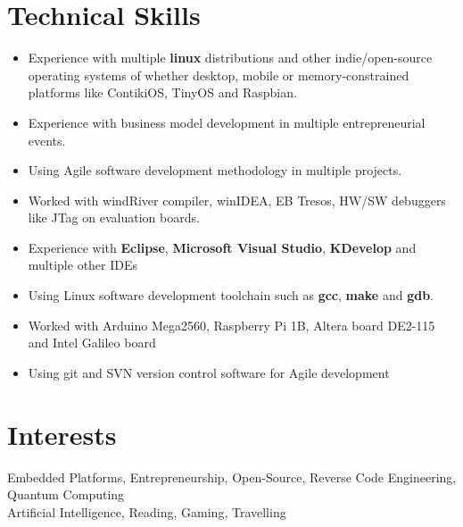 \documentclass[letterpaper]{twentysecondcv}
\begin{document}
\section{Technical Skills}
\begin{itemize}
\setlength\itemsep{-0.29em}
\item Experience with multiple \textbf{linux} distributions and other indie/open-source operating systems of whether desktop, mobile or memory-constrained platforms like ContikiOS, TinyOS and Raspbian.
\item Experience with business model development in multiple entrepreneurial events.
\item Using Agile software development methodology in multiple projects.
\item Worked with windRiver compiler, winIDEA, EB Tresos, HW/SW debuggers like JTag on evaluation boards.
\item Experience with \textbf{Eclipse}, \textbf{Microsoft Visual Studio}, \textbf{KDevelop} and multiple other IDEs
\item Using Linux software development toolchain such as \textbf{gcc}, \textbf{make} and \textbf{gdb}.
\item Worked with Arduino Mega2560, Raspberry Pi 1B, Altera board DE2-115 and Intel Galileo board
\item Using git and SVN version control software for Agile development
\end{itemize}

\section{Interests}
Embedded Platforms, Entrepreneurship, Open-Source, Reverse Code Engineering, Quantum Computing\\
Artificial Intelligence, 
Reading, Gaming, Travelling

{\let\thefootnote\relax{}}

\end{document}

